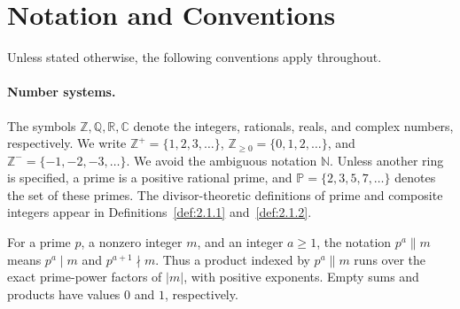\documentclass[11pt]{article}
\theoremstyle{ntstyle}
\newcommand{\Primes}{\mathbb{P}}
\begin{document}
\section*{Notation and Conventions}

\noindent Unless stated otherwise, the following conventions apply throughout.

\paragraph*{Number systems.}
The symbols $\mathbb{Z},\mathbb{Q},\mathbb{R},\mathbb{C}$ denote the integers, rationals, reals,
and complex numbers, respectively.
We write $\mathbb{Z}^+=\{1,2,3,\ldots\}$, $\mathbb{Z}_{\ge0}=\{0,1,2,\ldots\}$, and $\mathbb{Z}^-=\{-1,-2,-3,\ldots\}$.
We avoid the ambiguous notation $\mathbb{N}$.
Unless another ring is specified, a prime is a positive rational prime, and
$\Primes=\{2,3,5,7,\ldots\}$ denotes the set of these primes.
The divisor-theoretic definitions of prime and composite integers appear in
Definitions~\ref{def:2.1.1} and~\ref{def:2.1.2}.

For a prime $p$, a nonzero integer $m$, and an integer $a\ge1$, the notation $p^a\parallel m$ means
$p^a\mid m$ and $p^{a+1}\nmid m$. Thus a product indexed by $p^a\parallel m$ runs over the exact
prime-power factors of $|m|$, with positive exponents. Empty sums and products have values $0$ and
$1$, respectively.
\end{document}
